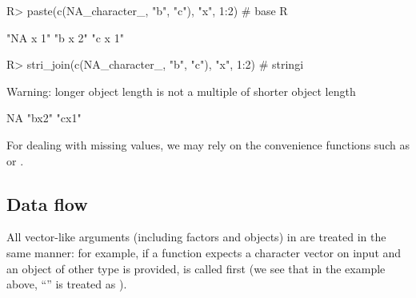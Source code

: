 \documentclass[nojss]{jss}
\begin{document}
\begin{Schunk}
\begin{Sinput}
R> paste(c(NA_character_, "b", "c"), "x", 1:2)  # base R
\end{Sinput}
\begin{Soutput}
[1] "NA x 1" "b x 2"  "c x 1"
\end{Soutput}
\begin{Sinput}
R> stri_join(c(NA_character_, "b", "c"), "x", 1:2)  # stringi
\end{Sinput}
\begin{Soutput}
Warning: longer object length is not a multiple of shorter object length
\end{Soutput}
\begin{Soutput}
[1] NA    "bx2" "cx1"
\end{Soutput}
\end{Schunk}

For dealing with missing values, we may rely on the
convenience functions such as  or
.
%



\subsection{Data flow}

All vector-like arguments (including factors and objects)
in  are treated in the same manner:
for example, if a function expects a character vector on input
and an object of other type is provided,
 is called first
(we see that in the example above,
``'' is treated as ).






%
%
%




%
%
\end{document}
